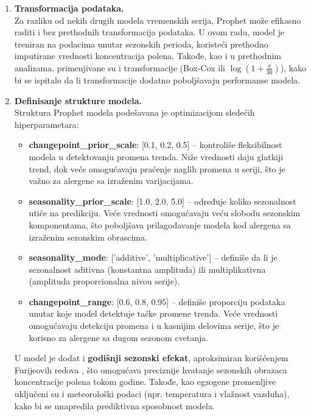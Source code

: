 \documentclass[12pt]{article}
\begin{document}
\begin{enumerate}
    \item \textbf{Transformacija podataka.} \\
    Za razliku od nekih drugih modela vremenskih serija, Prophet može efikasno raditi i bez prethodnih transformacija podataka. U ovom radu, model je treniran na podacima unutar sezonskih perioda, koristeći prethodno imputirane vrednosti koncentracija polena. Takođe, kao i u prethodnim analizama, primenjivane su i transformacije (Box-Cox ili $\log(1 + \frac{x}{30})$), kako bi se ispitalo da li transformacije dodatno poboljšavaju performanse modela.

    \item \textbf{Definisanje strukture modela.} \\
    Struktura Prophet modela podešavana je optimizacijom sledećih hiperparametara:
    \begin{itemize}
        \item \textbf{changepoint\_prior\_scale}: [0.1, 0.2, 0.5] – kontroliše fleksibilnost modela u detektovanju promena trenda. Niže vrednosti daju glatkiji trend, dok veće omogućavaju praćenje naglih promena u seriji, što je važno za alergene sa izraženim varijacijama.
        \item \textbf{seasonality\_prior\_scale}: [1.0, 2.0, 5.0] – određuje koliko sezonalnost utiče na predikciju. Veće vrednosti omogućavaju veću slobodu sezonskim komponentama, što poboljšava prilagođavanje modela kod alergena sa izraženim sezonskim obrascima.
        \item \textbf{seasonality\_mode}: ['additive', 'multiplicative'] – definiše da li je sezonalnost aditivna (konstantna amplituda) ili multiplikativna (amplituda proporcionalna nivou serije).
        \item \textbf{changepoint\_range}: [0.6, 0.8, 0.95] – definiše proporciju podataka unutar koje model detektuje tačke promene trenda. Veće vrednosti omogućavaju detekciju promena i u kasnijim delovima serije, što je korisno za alergene sa dugom sezonom cvetanja.
    \end{itemize}

    U model je dodat i \textbf{godišnji sezonski efekat}, aproksimiran korišćenjem Furijeovih redova \cite{hyndman2018forecasting}, što omogućava preciznije hvatanje sezonskih obrazaca koncentracije polena tokom godine. Takođe, kao egzogene promenljive uključeni su i meteorološki podaci (npr. temperatura i vlažnost vazduha), kako bi se unapredila prediktivna sposobnost modela.


\end{enumerate}
\end{document}
